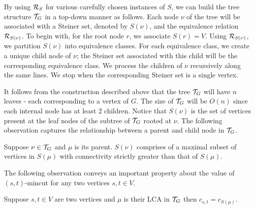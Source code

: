By using ${\cal R}_S$ for various carefully chosen instances of $S$, we can build the tree structure ${\cal T}_G$ in a top-down manner as follows. Each node $\nu$ of the tree will be associated with a Steiner set, denoted by $S(\nu)$, and the equivalence relation ${\cal R}_{S(\nu)}$. To begin with, for the root node $r$, we associate $S(r)=V$.
Using ${\cal  R}_{S(\nu)}$, we partition $S(\nu)$ into equivalence classes. For each equivalence class, we create a unique child node of $\nu$; the Steiner set associated with this child will be the corresponding equivalence class. We process the children of $\nu$ recursively along the same lines. We stop when the corresponding Steiner set is a single vertex. 

It follows from the construction described above that the tree ${\cal T}_G$ will have $n$ leaves - each corresponding to a vertex of $G$. The size of ${\cal T}_G$ will be $O(n)$ since each internal node has at least 2 children. Notice that $S(\nu)$ is the set of vertices present at the leaf nodes of the subtree of ${\cal T}_G$ rooted at $\nu$. The following observation captures the relationship between a parent and child node in 
${\cal T}_G$.

\begin{observation}
\label{obs:maximal-subset-subtree}
Suppose $\nu \in {\cal T}_G$ and $\mu$ is its parent. $S(\nu)$ comprises of a maximal subset of vertices in $S(\mu)$ with connectivity strictly greater than that of $S(\mu)$.
\end{observation}

The following observation conveys an important property about the value of $(s,t)$-mincut for any two vertices $s,t\in V$.

\begin{observation}
\label{obs:(s,t)-mincut-lca}
Suppose $s,t \in V$ are two vertices and $\mu$ is their LCA in ${\cal T}_G$ then $c_{s,t}=c_{S(\mu)}$.
\end{observation}




